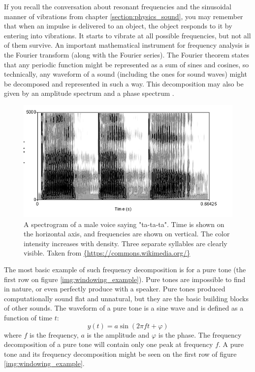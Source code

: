 If you recall the conversation about resonant frequencies and the sinusoidal manner of vibrations from chapter \ref{section:physics_sound}, you may remember that when an impulse is delivered to an object, the object responds to it by entering into vibrations. It starts to vibrate at all possible frequencies, but not all of them survive. An important mathematical instrument for frequency analysis is the Fourier transform (along with the Fourier series). The Fourier theorem states that any periodic function might be represented as a sum of sines and cosines, so technically, any waveform of a sound (including the ones for sound waves) might be decomposed and represented in such a way. This decomposition may also be given by an amplitude spectrum and a phase spectrum \cite{Schnupp2011}.\\

\begin{figure}[t]
	\centering
	\includegraphics[height=0.25\textheight]{include/spectrogram_example}
	\caption[An example of a spectrogram]{A spectrogram of a male voice saying "ta-ta-ta". Time is shown on the horizontal axis, and frequencies are shown on vertical. The color intensity increases with density. Three separate syllables are clearly visible. Taken from \url{{https://commons.wikimedia.org/}}}
	\label{img:spectrogram_example}
\end{figure}

The most basic example of such frequency decomposition is for a pure tone (the first row on figure \ref{img:windowing_example}). Pure tones are impossible to find in nature, or even perfectly produce with a speaker. Pure tones produced computationally sound flat and unnatural, but they are the basic building blocks of other sounds. The waveform of a pure tone is a sine wave and is defined as a function of time $t$:
\begin{equation}
	y(t) = a\sin(2\pi{}ft + \varphi)
\end{equation}
where $f$ is the frequency, $a$ is the amplitude and $\varphi$ is the phase. The frequency decomposition of a pure tone will contain only one peak at frequency $f$. A pure tone and its frequency decomposition might be seen on the first row of figure \ref{img:windowing_example}.\\

